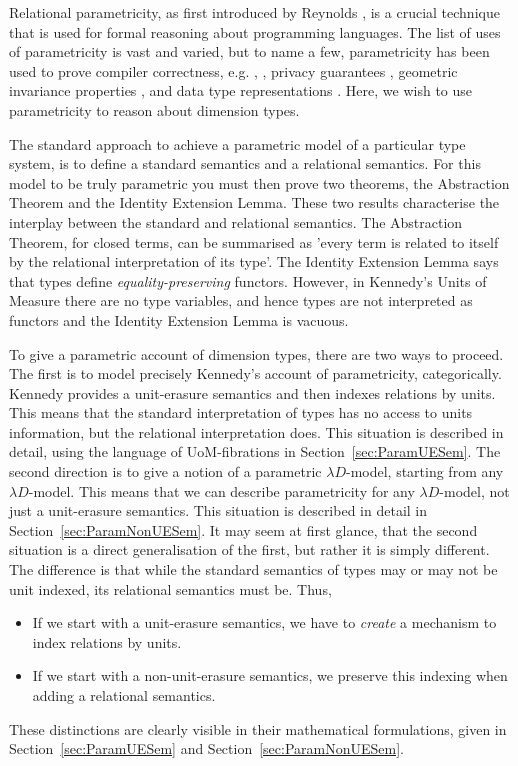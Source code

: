 \documentclass[a4paper,UKenglish]{lipics}
\newcommand{\UoM}{Units of Measure\xspace}
\begin{document}
Relational parametricity, as first introduced by Reynolds \cite{reynolds1983types} , is a crucial technique that is used for formal reasoning about programming languages. The list of uses of parametricity is vast and varied, but to name a few, parametricity has been used to prove compiler correctness, e.g. \cite{benton2009biorthogonality}, \cite{ahmed2008typed}, privacy guarantees \cite{reed2010distance}, geometric invariance properties \cite{atkey2013abstraction}, and data type representations \cite{hasegawa1994categorical}. Here, we wish to use parametricity to reason about dimension types.

The standard approach to achieve a parametric model of a particular type system, is to define a standard semantics and a relational semantics. For this model to be truly parametric you must then prove two theorems, the Abstraction Theorem and the Identity Extension Lemma. These two results characterise the interplay between the standard and relational semantics. The Abstraction Theorem, for closed terms, can be summarised as 'every term is related to itself by the relational interpretation of its type'. The Identity Extension Lemma says that types define \emph{equality-preserving} functors. However, in Kennedy's \UoM there are no type variables, and hence types are not  interpreted as functors and the Identity Extension Lemma is vacuous.

To give a parametric account of dimension types, there are two ways to proceed. The first is to model precisely Kennedy's account of parametricity, categorically. Kennedy provides a unit-erasure semantics and then indexes relations by units. This means that the standard interpretation of types has no access to units information, but the relational interpretation does. This situation is described in detail, using the language of UoM-fibrations in Section~\ref{sec:ParamUESem}. The second direction is to give a notion of a parametric $\lambda D$-model, starting from any $\lambda D$-model. This means that we can describe parametricity for any $\lambda D$-model, not just a unit-erasure semantics. This situation is described in detail in Section~\ref{sec:ParamNonUESem}. It may seem at first glance, that the second situation is a direct generalisation of the first, but rather it is simply different. The difference is that while the standard semantics of types may or may not be unit indexed, its relational semantics must be. Thus,
\begin{itemize}
 \item If we start with a unit-erasure semantics, we have to \emph{create} a mechanism to index relations by units.
 \item If we start with a non-unit-erasure semantics, we preserve this indexing when adding a relational semantics.
\end{itemize}
These distinctions are clearly visible in their mathematical formulations, given in Section~\ref{sec:ParamUESem} and Section~\ref{sec:ParamNonUESem}.
\end{document}
